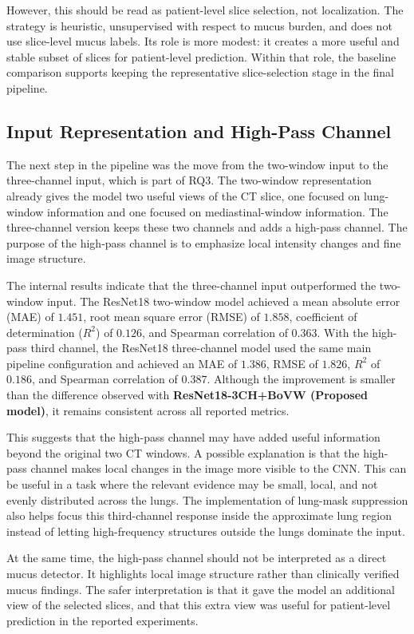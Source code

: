 However, this should be read as patient-level slice selection, not localization. The strategy is heuristic, unsupervised with respect to mucus burden, and does not use slice-level mucus labels. Its role is more modest: it creates a more useful and stable subset of slices for patient-level prediction. Within that role, the baseline comparison supports keeping the representative slice-selection stage in the final pipeline.


\subsection{Input Representation and High-Pass Channel}
The next step in the pipeline was the move from the two-window input to the three-channel input, which is part of RQ3. The two-window representation already gives the model two useful views of the CT slice, one focused on lung-window information and one focused on mediastinal-window information. The three-channel version keeps these two channels and adds a high-pass channel. The purpose of the high-pass channel is to emphasize local intensity changes and fine image structure.

The internal results indicate that the three-channel input outperformed the two-window input. The ResNet18 two-window model achieved a mean absolute error (MAE) of \(1.451\), root mean square error (RMSE) of \(1.858\), coefficient of determination (\(R^2\)) of \(0.126\), and Spearman correlation of \(0.363\). With the high-pass third channel, the ResNet18 three-channel model used the same main pipeline configuration and achieved an MAE of \(1.386\), RMSE of \(1.826\), \(R^2\) of \(0.186\), and Spearman correlation of \(0.387\). Although the improvement is smaller than the difference observed with \textbf{ResNet18-3CH+BoVW (Proposed model)}, it remains consistent across all reported metrics.

This suggests that the high-pass channel may have added useful information beyond the original two CT windows. A possible explanation is that the high-pass channel makes local changes in the image more visible to the CNN. This can be useful in a task where the relevant evidence may be small, local, and not evenly distributed across the lungs. The implementation of lung-mask suppression also helps focus this third-channel response inside the approximate lung region instead of letting high-frequency structures outside the lungs dominate the input.

At the same time, the high-pass channel should not be interpreted as a direct mucus detector. It highlights local image structure rather than clinically verified mucus findings. The safer interpretation is that it gave the model an additional view of the selected slices, and that this extra view was useful for patient-level prediction in the reported experiments.


